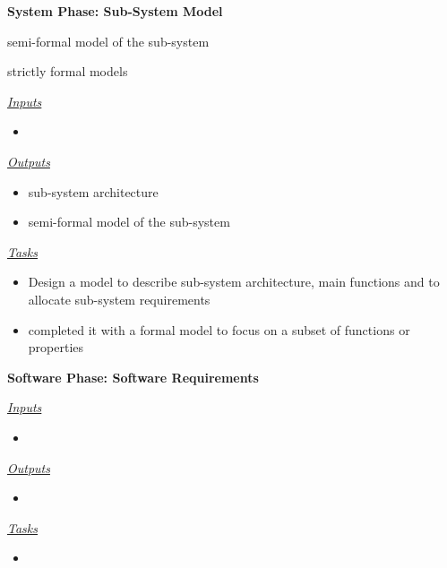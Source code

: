 \documentclass{template/openetcs_article}
\begin{document}
\begin{description}
\item \textbf{System Phase: Sub-System Model}

\begin{description}
\item semi-formal model of the sub-system
\item strictly formal models
\end{description}

\underline{\textit{Inputs}}
\begin{itemize}
\item 
\end{itemize}

\underline{\textit{Outputs}}
\begin{itemize}
\item sub-system architecture
\item semi-formal model of the sub-system
\end{itemize}

\underline{\textit{Tasks}}
\begin{itemize}
\item Design a model to describe sub-system architecture, main functions and to allocate sub-system requirements
\item completed it with a formal model to focus on a subset of functions or properties
\end{itemize}
\end{description}

\begin{description}
\item \textbf{Software Phase: Software Requirements}

\underline{\textit{Inputs}}
\begin{itemize}
\item 
\end{itemize}

\underline{\textit{Outputs}}
\begin{itemize}
\item 
\end{itemize}

\underline{\textit{Tasks}}
\begin{itemize}
\item 
\end{itemize}
\end{description}
\end{document}

